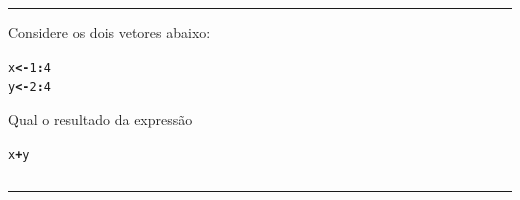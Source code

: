 \documentclass[a4paper,11pt,fleqn]{article}\usepackage[]{graphicx}\usepackage[]{color}
\makeatletter
\newcommand{\hlnum}[1]{\textcolor[rgb]{0,0,0}{#1}}%
\newcommand{\hlopt}[1]{\textcolor[rgb]{0,0,0}{\textbf{#1}}}%
\newcommand{\hlstd}[1]{\textcolor[rgb]{0,0,0}{#1}}%
\newcommand{\hlkwb}[1]{\textcolor[rgb]{0,0,0}{\textbf{#1}}}%
\newenvironment{kframe}{%
 \def\at@end@of@kframe{}%
 \ifinner\ifhmode%
  \def\at@end@of@kframe{\end{minipage}}%
  \begin{minipage}{\columnwidth}%
 \fi\fi%
 \def\FrameCommand##1{\hskip\@totalleftmargin \hskip-\fboxsep
 \colorbox{shadecolor}{##1}\hskip-\fboxsep
     \hskip-\linewidth \hskip-\@totalleftmargin \hskip\columnwidth}%
 \MakeFramed {\advance\hsize-\width
   \@totalleftmargin\z@ \linewidth\hsize
   \@setminipage}}%
 {\par\unskip\endMakeFramed%
 \at@end@of@kframe}
\newenvironment{knitrout}{}{} %
\theoremstyle{definition}
\makeatother
\begin{document}
\vspace{0.3cm}
\hrule
\vspace{0.3cm}

\begin{compactenum}[10.]
\item Considere os dois vetores abaixo:
\begin{knitrout}\small
{}\color{fgcolor}\begin{kframe}
\begin{alltt}
\hlstd{x} \hlkwb{<-} \hlnum{1}\hlopt{:}\hlnum{4}
\hlstd{y} \hlkwb{<-} \hlnum{2}\hlopt{:}\hlnum{4}
\end{alltt}
\end{kframe}
\end{knitrout}
Qual o resultado da expressão
\begin{knitrout}\small
{}\color{fgcolor}\begin{kframe}
\begin{alltt}
\hlstd{x} \hlopt{+} \hlstd{y}
\end{alltt}
\end{kframe}
\end{knitrout}
\begin{tabular}{| p{1cm} | p{1cm} | p{1cm} | p{1cm} | p{1cm} | p{1cm}
  | p{1cm} | p{1cm} | p{1cm} | p{1cm} |}
  \hline
  & & & & & & & & & \\
  \hline
\end{tabular}

\end{compactenum}

\vspace{0.3cm}
\hrule
\vspace{0.3cm}
\end{document}
